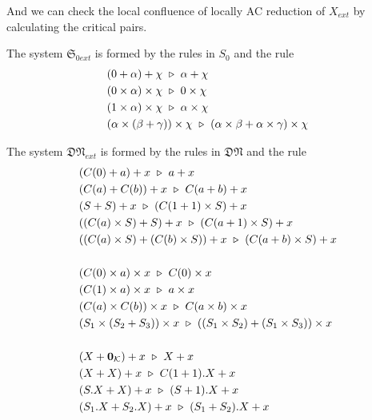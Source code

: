 And we can check the local confluence of locally AC reduction of $X_{ext}$ by calculating the critical pairs.

\begin{proposition}
  The system $\mathfrak{S}_{0ext}$ is formed by the rules in $S_0$ and the rule
  \begin{align*}
    & (0 + \alpha) + \chi \ \triangleright\  \alpha + \chi \\
    & (0 \times \alpha) \times \chi \ \triangleright\  0 \times \chi \\
    & (1 \times \alpha) \times \chi \ \triangleright\  \alpha \times \chi \\
    & (\alpha \times (\beta + \gamma)) \times \chi \ \triangleright\  (\alpha \times \beta + \alpha \times \gamma) \times \chi \\
  \end{align*}
\end{proposition}

\begin{proposition}
  The system $\mathfrak{DN}_{ext}$ is formed by the rules in $\mathfrak{DN}$ and the rule
  \begin{align*}
    & (C(0) + a) + x \ \triangleright\  a + x \\
    & (C(a) + C(b)) + x \ \triangleright\  C(a + b) + x \\
    & (S + S) + x \ \triangleright\  (C(1 + 1) \times S) + x \\
    & ((C(a) \times S) + S) + x \ \triangleright\  (C(a + 1) \times S) + x \\
    & ((C(a) \times S) + (C(b) \times S)) + x \ \triangleright\  (C(a + b) \times S) + x \\
    \\
    & (C(0) \times a) \times x \ \triangleright\  C(0) \times x \\
    & (C(1) \times a) \times x \ \triangleright\  a \times x \\
    & (C(a) \times C(b)) \times x \ \triangleright\  C(a \times b) \times x \\
    & (S_1 \times (S_2 + S_3)) \times x \ \triangleright\  ((S_1 \times S_2) + (S_1 \times S_3)) \times x \\
    \\
    & (X + \mathbf{0}_\mathcal{K}) + x \ \triangleright\  X + x \\
    & (X + X) + x \ \triangleright\  C(1 + 1).X + x \\
    & (S.X + X) + x \ \triangleright\  (S + 1).X + x \\
    & (S_1.X + S_2.X) + x \ \triangleright\  (S_1 + S_2).X + x
  \end{align*}
\end{proposition}

